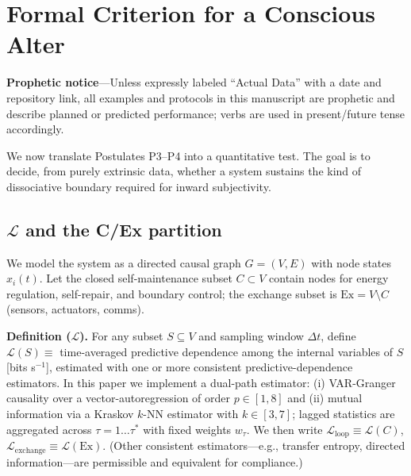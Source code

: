 \documentclass[11pt]{article}
\begin{document}
\section{Formal Criterion for a Conscious Alter}
\label{sec:criterion}

\textbf{Prophetic notice}---Unless expressly labeled ``Actual Data'' with a date and repository link, all examples and protocols in this manuscript are prophetic and describe planned or predicted performance; verbs are used in present/future tense accordingly.

We now translate Postulates P3--P4 into a quantitative test. The goal is to decide, from purely extrinsic data, whether a system sustains the kind of dissociative boundary required for inward subjectivity.

\subsection{$\mathcal{L}$ and the C/Ex partition}
\label{sec:l_partition}

We model the system as a directed causal graph $G = (V, E)$ with node states $x_i(t)$. Let the closed self-maintenance subset $C \subset V$ contain nodes for energy regulation, self-repair, and boundary control; the exchange subset is $\text{Ex} = V \setminus C$ (sensors, actuators, comms).

\textbf{Definition ($\mathcal{L}$).} For any subset $S \subseteq V$ and sampling window $\Delta t$, define $\mathcal{L}(S) \equiv$ time-averaged predictive dependence among the internal variables of $S$ [bits s$^{-1}$], estimated with one or more consistent predictive-dependence estimators. In this paper we implement a dual-path estimator: (i) VAR-Granger causality over a vector-autoregression of order $p \in [1,8]$ and (ii) mutual information via a Kraskov $k$-NN estimator with $k \in [3,7]$; lagged statistics are aggregated across $\tau = 1 \ldots \tau^*$ with fixed weights $w_\tau$. We then write $\mathcal{L}_{\text{loop}} \equiv \mathcal{L}(C)$, $\mathcal{L}_{\text{exchange}} \equiv \mathcal{L}(\text{Ex})$. (Other consistent estimators---e.g., transfer entropy, directed information---are permissible and equivalent for compliance.)
\end{document}
